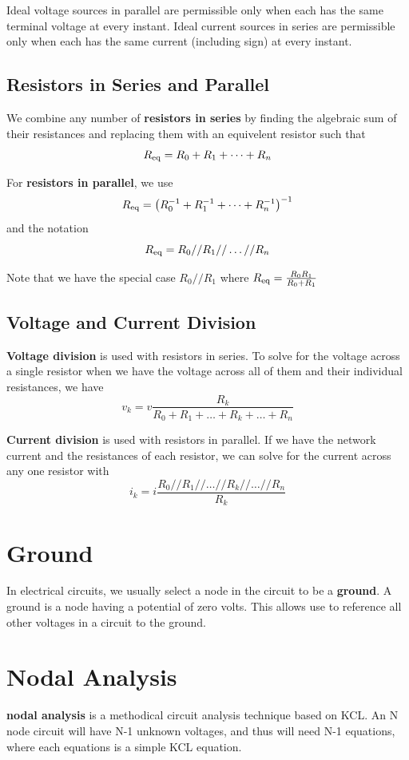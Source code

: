 \documentclass[12pt]{article}
\begin{document}
Ideal voltage sources in parallel are permissible only when each has the same terminal voltage at every instant. Ideal current sources in series are permissible only when each has the same current (including sign) at every instant.

\subsection*{Resistors in Series and Parallel}
We combine any number of {\bf resistors in series} by finding the algebraic sum of their resistances and replacing them with an equivelent resistor such that \[ R_{{\rm eq}} = R_0 + R_1 + \dots + R_n \]

For {\bf resistors in parallel}, we use \[ R_{{\rm eq}} = \bigl(R_0^{-1} + R_1^{-1} + \dots + R_n^{-1}\bigl)^{-1} \] and the notation \[ R_{{\rm eq}} = R_0//R_1//\dots//R_n \]

Note that we have the special case $R_0//R_1$ where $R_{{\rm eq}} = \frac{R_0R_1}{R_0 + R_1}$

\subsection*{Voltage and Current Division}
{\bf Voltage division} is used with resistors in series. To solve for the voltage across a single resistor when we have the voltage across all of them and their individual resistances, we have \[ v_k = v\frac{R_k}{R_0 + R_1 + \dots + R_k + \dots + R_n} \]

{\bf Current division} is used with resistors in parallel. If we have the network current and the resistances of each resistor, we can solve for the current across any one resistor with \[ i_k = i\frac{R_0//R_1//\dots//R_k//\dots//R_n}{R_k} \]

\section*{Ground}
In electrical circuits, we usually select a node in the circuit to be a {\bf ground}. A ground is a node having a potential of zero volts. This allows use to reference all other voltages in a circuit to the ground.

\section*{Nodal Analysis}
{\bf nodal analysis} is a methodical circuit analysis technique based on KCL. An N node circuit will have N-1 unknown voltages, and thus will need N-1 equations, where each equations is a simple KCL equation.
\end{document}
